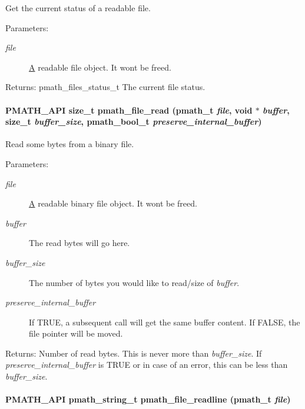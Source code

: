 Get the current status of a readable file. 

\begin{Desc}
\item[Parameters:]
\begin{description}
\item[{\em file}]\hyperlink{class_a}{A} readable file object. It wont be freed. \end{description}
\end{Desc}
\begin{Desc}
\item[Returns:]pmath\_\-files\_\-status\_\-t The current file status. \end{Desc}
\hypertarget{group__file__api_g045e5eeb1b78c481c5479fc52ba3a402}{
\paragraph[{pmath\_\-file\_\-read}]{\setlength{\rightskip}{0pt plus 5cm}PMATH\_\-API size\_\-t pmath\_\-file\_\-read ({\bf pmath\_\-t} {\em file}, \/  void $\ast$ {\em buffer}, \/  size\_\-t {\em buffer\_\-size}, \/  {\bf pmath\_\-bool\_\-t} {\em preserve\_\-internal\_\-buffer})}\hfill}
\label{group__file__api_g045e5eeb1b78c481c5479fc52ba3a402}


Read some bytes from a binary file. 

\begin{Desc}
\item[Parameters:]
\begin{description}
\item[{\em file}]\hyperlink{class_a}{A} readable binary file object. It wont be freed. \item[{\em buffer}]The read bytes will go here. \item[{\em buffer\_\-size}]The number of bytes you would like to read/size of {\em buffer\/}. \item[{\em preserve\_\-internal\_\-buffer}]If TRUE, a subsequent call will get the same buffer content. If FALSE, the file pointer will be moved. \end{description}
\end{Desc}
\begin{Desc}
\item[Returns:]Number of read bytes. This is never more than {\em buffer\_\-size\/}. If {\em preserve\_\-internal\_\-buffer\/} is TRUE or in case of an error, this can be less than {\em buffer\_\-size\/}. \end{Desc}
\hypertarget{group__file__api_gfe0826b3bb3e06907074976c57a67dbf}{
\paragraph[{pmath\_\-file\_\-readline}]{\setlength{\rightskip}{0pt plus 5cm}PMATH\_\-API {\bf pmath\_\-string\_\-t} pmath\_\-file\_\-readline ({\bf pmath\_\-t} {\em file})}\hfill}
\label{group__file__api_gfe0826b3bb3e06907074976c57a67dbf}


